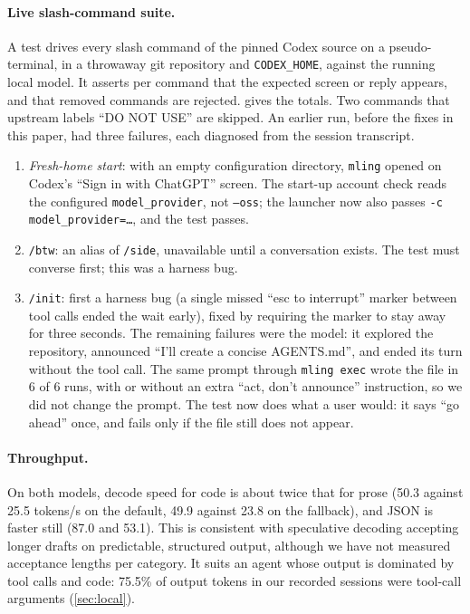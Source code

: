\documentclass[11pt]{article}
\newcommand{\code}[1]{\texttt{#1}}
\begin{document}
\paragraph{Live slash-command suite.} A test drives every slash command of the pinned Codex source
on a pseudo-terminal, in a throwaway git repository and \code{CODEX\_HOME}, against the running
local model. It asserts per command that the expected screen or reply appears, and that removed
commands are rejected.  gives the totals. Two commands that upstream labels ``DO NOT
USE'' are skipped. An earlier run, before the fixes in this paper, had three failures, each
diagnosed from the session transcript.
\begin{enumerate}
  \item \emph{Fresh-home start}: with an empty configuration directory, \code{mling} opened on
    Codex's ``Sign in with ChatGPT'' screen. The start-up account check reads the configured
    \code{model\_provider}, not \code{--oss}; the launcher now also passes
    \code{-c model\_provider=\ldots}, and the test passes.
  \item \code{/btw}: an alias of \code{/side}, unavailable until a conversation exists. The test
    must converse first; this was a harness bug.
  \item \code{/init}: first a harness bug (a single missed ``esc to interrupt'' marker between tool
    calls ended the wait early), fixed by requiring the marker to stay away for three seconds. The
    remaining failures were the model: it explored the repository, announced ``I'll create a
    concise AGENTS.md'', and ended its turn without the tool call. The same prompt through
    \code{mling exec} wrote the file in 6 of 6 runs, with or without an extra
    ``act, don't announce'' instruction, so we did not change the prompt. The test now does what a
    user would: it says ``go ahead'' once, and fails only if the file still does not appear.
\end{enumerate}

\paragraph{Throughput.} On both models, decode speed for code is about twice that for prose (50.3
against 25.5 tokens/s on the default, 49.9 against 23.8 on the fallback), and JSON is faster still
(87.0 and 53.1). This is consistent with speculative decoding accepting longer drafts on
predictable, structured output, although we have not measured acceptance lengths per category. It
suits an agent whose output is dominated by tool calls and code: 75.5\% of output tokens in our
recorded sessions were tool-call arguments (\cref{sec:local}).
\end{document}
